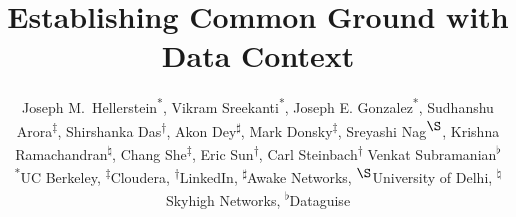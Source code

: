 \documentclass{sig-alternate}
\begin{document}
\newcommand{\smallitem}[1]{\vspace{0.5em}\noindent\textbf{#1}}
\newcommand{\smallitembot}{\vspace{0.5em}\noindent}


\newcommand{\jmh}[1]{{\textcolor{red}{[[#1 -- jmh]]}}}
\newcommand{\joey}[1]{{\textcolor{cyan}{[[#1 -- jeg]]}}}
\newcommand{\msd}[1]{{\textcolor{green}{[[#1 -- msd]]}}}
\newcommand{\akon}[1]{{\textcolor{orange}{[[#1 -- akon]]}}}
\newcommand{\vikram}[1]{{\textcolor{blue}{[[#1 --vikram]]}}}

\newcommand{\core}{version graph\xspace}
\newcommand{\mantle}{model graph\xspace}
\newcommand{\crust}{lineage graph\xspace}
\newcommand{\Core}{Version Graph\xspace}
\newcommand{\Mantle}{Model Graph\xspace}
\newcommand{\Crust}{Lineage Graph\xspace}

\newcommand{\version}{\kw{Version}\xspace}
\newcommand{\richversion}{\kw{RichVersion}\xspace}
\newcommand{\thing}{\kw{Item}\xspace}
\newcommand{\GroundItem}{\kw{Item}\xspace}
\newcommand{\node}{\kw{Node}\xspace}
\newcommand{\edge}{\kw{Edge}\xspace}
\newcommand{\structure}{\kw{Structure}\xspace}
\newcommand{\graph}{\kw{Graph}\xspace}
\newcommand{\TVID}{\kw{TVID}\xspace}
\newcommand{\gtag}{\kw{Tag}\xspace}
\newcommand{\uri}{\kw{URI}\xspace}

\newcommand{\versiongraph}{versiongraph\xspace}
\newcommand{\modelgraph}{modelgraph\xspace}
\newcommand{\lineagegraph}{lineagegraph\xspace}
\newcommand{\versiongraphs}{versiongraphs\xspace}
\newcommand{\modelgraphs}{modelgraphs\xspace}
\newcommand{\lineagegraphs}{lineagegraphs\xspace}
\newcommand{\groundwire}{GroundWire\xspace}

\newcommand{\kw}[1]{{\small\texttt{#1}}}
\newcommand{\lilemail}[1]{\email{\small #1}}



\title{Establishing Common Ground with Data Context}

\author{
\alignauthor
Joseph M.\ Hellerstein\textsuperscript{*}, 
Vikram Sreekanti\textsuperscript{*}, 
Joseph E. Gonzalez\textsuperscript{*},
Sudhanshu Arora\textsuperscript{$\ddagger$},
Shirshanka Das\textsuperscript{$\dagger$}, 
Akon Dey\textsuperscript{$\sharp$}, 
Mark Donsky\textsuperscript{$\ddagger$}, 
Sreyashi Nag\textsuperscript{$\S$}, 
Krishna Ramachandran\textsuperscript{$\natural$}, 
Chang She\textsuperscript{$\ddagger$},
Eric Sun\textsuperscript{$\dagger$}, 
Carl Steinbach\textsuperscript{$\dagger$}
Venkat Subramanian\textsuperscript{$\flat$}\\
{\small
\textsuperscript{*}UC Berkeley, 
\textsuperscript{$\ddagger$}Cloudera,
\textsuperscript{$\dagger$}LinkedIn,
\textsuperscript{$\sharp$}Awake Networks,
\textsuperscript{$\S$}University of Delhi,
\textsuperscript{$\natural$}Skyhigh Networks,
\textsuperscript{$\flat$}Dataguise
}
}
\end{document}
